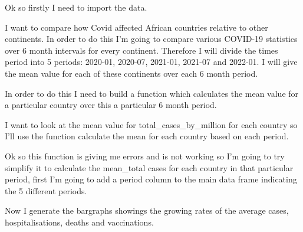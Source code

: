 \documentclass[11pt,preprint, authoryear]{elsarticle}
\numberwithin{equation}{section}
\numberwithin{figure}{section}
\numberwithin{table}{section}
\begin{document}
Ok so firstly I need to import the data.

I want to compare how Covid affected African countries relative to other
continents. In order to do this I'm going to compare various COVID-19
statistics over 6 month intervals for every continent. Therefore I will
divide the times period into 5 periods: 2020-01, 2020-07, 2021-01,
2021-07 and 2022-01. I will give the mean value for each of these
continents over each 6 month period.

In order to do this I need to build a function which calculates the mean
value for a particular country over this a particular 6 month period.

I want to look at the mean value for total\_cases\_by\_million for each
country so I'll use the function calculate the mean for each country
based on each period.

Ok so this function is giving me errors and is not working so I'm going
to try simplify it to calculate the mean\_total cases for each country
in that particular period, first I'm going to add a period column to the
main data frame indicating the 5 different periods.

Now I generate the bargraphs showings the growing rates of the average
cases, hospitalisations, deaths and vaccinations.
\end{document}
